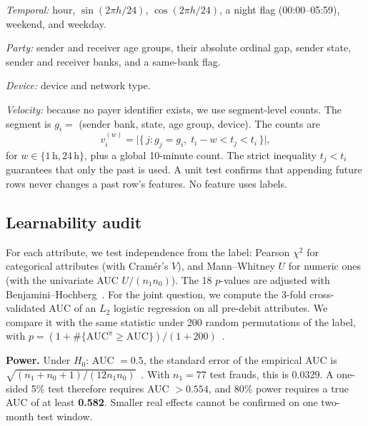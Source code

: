 \documentclass[conference]{IEEEtran}
\begin{document}
\emph{Temporal:} hour, $\sin(2\pi h/24)$, $\cos(2\pi h/24)$, a night flag (00:00--05:59), weekend, and weekday.

\emph{Party:} sender and receiver age groups, their absolute ordinal gap, sender state, sender and receiver banks, and a same-bank flag.

\emph{Device:} device and network type.

\emph{Velocity:} because no payer identifier exists, we use segment-level counts. The segment is $g_i = $ (sender bank, state, age group, device). The counts are
\begin{equation}
v_i^{(w)} = \big|\{\, j : g_j = g_i,\; t_i - w < t_j < t_i \,\}\big|,
\end{equation}
for $w\in\{1\,\text{h}, 24\,\text{h}\}$, plus a global 10-minute count. The strict inequality $t_j<t_i$ guarantees that only the past is used. A unit test confirms that appending future rows never changes a past row's features. No feature uses labels.

\subsection{Learnability audit}\label{sec:auditmethod}
For each attribute, we test independence from the label: Pearson $\chi^2$ for categorical attributes (with Cram\'er's $V$), and Mann--Whitney $U$ for numeric ones (with the univariate AUC $U/(n_1n_0)$). The 18 $p$-values are adjusted with Benjamini--Hochberg~\cite{bh1995}. For the joint question, we compute the 3-fold cross-validated AUC of an $L_2$ logistic regression on all pre-debit attributes. We compare it with the same statistic under 200 random permutations of the label, with $p = (1+\#\{\text{AUC}^{\pi}\ge \text{AUC}\})/(1+200)$~\cite{ojala2010}.

\textbf{Power.} Under $H_0$: AUC $=0.5$, the standard error of the empirical AUC is $\sqrt{(n_1+n_0+1)/(12 n_1 n_0)}$~\cite{hanley1982}. With $n_1=77$ test frauds, this is 0.0329. A one-sided 5\% test therefore requires AUC $>0.554$, and 80\% power requires a true AUC of at least \textbf{0.582}. Smaller real effects cannot be confirmed on one two-month test window.
\end{document}
